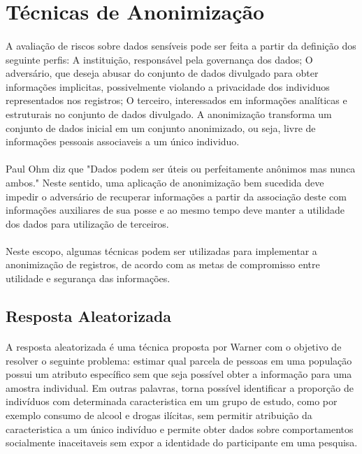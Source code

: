 \section{Técnicas de Anonimização}

\paragraph{} A avaliação de riscos sobre dados sensíveis pode ser feita a partir da definição dos seguinte perfis: A instituição, responsável pela governança dos dados; O adversário, que deseja abusar do conjunto de dados divulgado para obter informações implicitas, possivelmente violando a privacidade dos individuos representados nos registros; O terceiro, interessados em informações analíticas e estruturais no conjunto de dados divulgado. A anonimização transforma um conjunto de dados inicial em um conjunto anonimizado, ou seja, livre de informações pessoais associaveis a um único individuo.

\paragraph{} Paul Ohm\cite{ohm2009} diz que "Dados podem ser úteis ou perfeitamente anônimos mas nunca ambos." Neste sentido, uma aplicação de anonimização bem sucedida deve impedir o adversário de recuperar informações a partir da associação deste com informações auxiliares de sua posse e ao mesmo tempo deve manter a utilidade dos dados para utilização de terceiros. 

\paragraph{} Neste escopo, algumas técnicas podem ser utilizadas para implementar a anonimização de registros, de acordo com as metas de compromisso entre utilidade e segurança das informações.

\subsection{Resposta Aleatorizada}

\paragraph{} A resposta aleatorizada é uma técnica proposta por Warner\cite{warner1965randomized} com o objetivo de resolver o seguinte problema: estimar qual parcela de pessoas em uma população possui um atributo específico sem que seja possível obter a informação para uma amostra individual. Em outras palavras, torna possível identificar a proporção de indivíduos com determinada caracteristica em um grupo de estudo, como por exemplo consumo de alcool e drogas ilícitas\cite{davila2010modelo}, sem permitir atribuição da caracteristica a um único indivíduo e permite obter dados sobre comportamentos socialmente inaceitaveis sem expor a identidade do participante em uma pesquisa.


